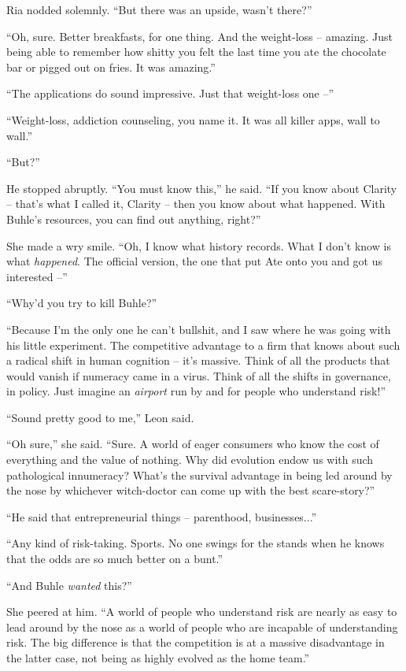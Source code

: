 Ria nodded solemnly. “But there was an upside, wasn't there?”

“Oh, sure. Better breakfasts, for one thing. And the weight-loss -- 
amazing. Just being able to remember how shitty you felt the last time 
you ate the chocolate bar or pigged out on fries. It was amazing.”

“The applications do sound impressive. Just that weight-loss one --”

“Weight-loss, addiction counseling, you name it. It was all killer 
apps, wall to wall.”

“But?”

He stopped abruptly. “You must know this,” he said. “If you know 
about Clarity -- that's what I called it, Clarity -- then you know 
about what happened. With Buhle's resources, you can find out anything, 
right?”

She made a wry smile. “Oh, I know what history records. What I don't 
know is what \emph{happened}. The official version, the one that put 
Ate onto you and got us interested --”

“Why'd you try to kill Buhle?”

“Because I'm the only one he can't bullshit, and I saw where he was 
going with his little experiment. The competitive advantage to a firm 
that knows about such a radical shift in human cognition -- it's 
massive. Think of all the products that would vanish if numeracy came 
in a virus. Think of all the shifts in governance, in policy. Just 
imagine an \emph{airport} run by and for people who understand risk!”

“Sound pretty good to me,” Leon said.

“Oh sure,” she said. “Sure. A world of eager consumers who know 
the cost of everything and the value of nothing. Why did evolution 
endow us with such pathological innumeracy? What's the survival 
advantage in being led around by the nose by whichever witch-doctor can 
come up with the best scare-story?”

“He said that entrepreneurial things -- parenthood, businesses...”

“Any kind of risk-taking. Sports. No one swings for the stands when 
he knows that the odds are so much better on a bunt.”

“And Buhle \emph{wanted} this?”

She peered at him. “A world of people who understand risk are nearly 
as easy to lead around by the nose as a world of people who are 
incapable of understanding risk. The big difference is that the 
competition is at a massive disadvantage in the latter case, not being 
as highly evolved as the home team.”

